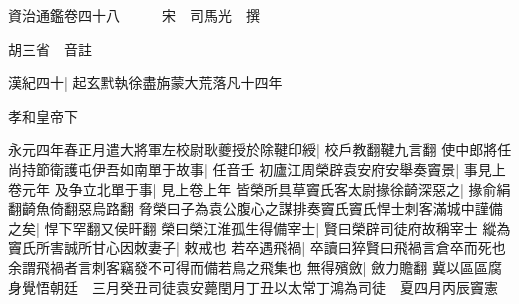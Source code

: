 資治通鑑卷四十八　　　宋　司馬光　撰

胡三省　音註

漢紀四十|{
	起玄黓執徐盡旃蒙大荒落凡十四年}


孝和皇帝下

永元四年春正月遣大將軍左校尉耿夔授於除鞬印綬|{
	校戶教翻鞬九言翻}
使中郎將任尚持節衛護屯伊吾如南單于故事|{
	任音壬}
初廬江周榮辟袁安府安舉奏竇景|{
	事見上卷元年}
及争立北單于事|{
	見上卷上年}
皆榮所具草竇氏客太尉掾徐齮深惡之|{
	掾俞絹翻齮魚倚翻惡烏路翻}
脅榮曰子為袁公腹心之謀排奏竇氏竇氏悍士刺客滿城中謹備之矣|{
	悍下罕翻又侯旰翻}
榮曰榮江淮孤生得備宰士|{
	賢曰榮辟司徒府故稱宰士}
縱為竇氏所害誠所甘心因敇妻子|{
	敕戒也}
若卒遇飛禍|{
	卒讀曰猝賢曰飛禍言倉卒而死也余謂飛禍者言刺客竊發不可得而備若鳥之飛集也}
無得殯斂|{
	斂力贍翻}
冀以區區腐身覺悟朝廷　三月癸丑司徒袁安薨閏月丁丑以太常丁鴻為司徒　夏四月丙辰竇憲

